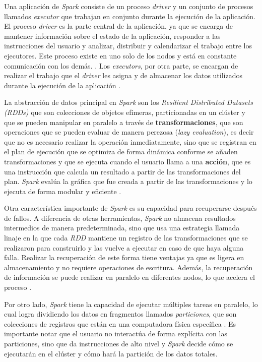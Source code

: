 Una aplicación de \textit{Spark} consiste de un proceso \textit{driver} y un conjunto de procesos llamados \textit{executor} que trabajan en conjunto durante la ejecución de la aplicación. El proceso \textit{driver} es la parte central de la aplicación, ya que se encarga de mantener información sobre el estado de la aplicación, responder a las instrucciones del usuario y analizar, distribuir y calendarizar el trabajo entre los ejecutores. Este proceso existe en uno solo de los nodos y está en constante comunicación con los demás. \cite{sparkguide}. Los \textit{executors}, por otra parte, se encargan de realizar el trabajo que el \textit{driver} les asigna y de almacenar los datos utilizados durante la ejecución de la aplicación \cite{sparkclusteroverview}.

La abstracción de datos principal en \textit{Spark} son los \textit{Resilient Distributed Datasets (RDDs)} que son colecciones de objetos efímeras, particionadas en un clúster y que se pueden manipular en paralelo a través de \textbf{transformaciones}, que son operaciones que se pueden evaluar de manera perezosa (\textit{lazy evaluation}), es decir que no es necesario realizar la operación inmediatamente, sino que se registran en el plan de ejecución que se optimiza de forma dinámica conforme se añaden transformaciones y que se ejecuta cuando el usuario llama a una \textbf{acción}, que es una instrucción que calcula un resultado a partir de las transformaciones del plan. \textit{Spark} evalúa la gráfica que fue creada a partir de las transformaciones y lo ejecuta de forma modular y eficiente \cite{sparkberkeley}.

Otra característica importante de \textit{Spark} es su capacidad para recuperarse después de fallos. A diferencia de otras herramientas, \textit{Spark} no almacena resultados intermedios de manera predeterminada, sino que usa una estrategia llamada linaje en la que cada \textit{RDD} mantiene un registro de las transformaciones que se realizaron para construirlo y las vuelve a ejecutar en caso de que haya alguna falla. Realizar la recuperación de este forma tiene ventajas ya que es ligera en almacenamiento y no requiere operaciones de escritura. Además, la recuperación de información se puede realizar en paralelo en diferentes nodos, lo que acelera el proceso \cite{sparkberkeley}.

Por otro lado, \textit{Spark} tiene la capacidad de ejecutar múltiples tareas en paralelo, lo cual logra dividiendo los datos en fragmentos llamados \textit{particiones}, que son colecciones de registros que están en una computadora física específica \cite{sparkguide}. Es importante notar que el usuario no interactúa de forma explícita con las particiones, sino que da instrucciones de alto nivel y \textit{Spark} decide cómo se ejecutarán en el clúster y cómo hará la partición de los datos totales.


